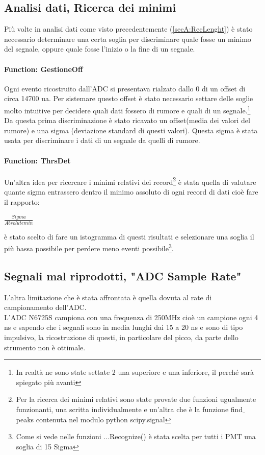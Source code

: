 \documentclass[a4paper]{article}
\begin{document}
\subsection{Analisi dati, Ricerca dei minimi}
\label{secA:Threshold}
Più volte in analisi dati come visto precedentemente (\ref{secA:RecLenght}) è stato necessario determinare una certa soglia per discriminare quale fosse un minimo del segnale, oppure quale fosse l'inizio o la fine di un segnale.
\paragraph{Function: GestioneOff}
Ogni evento ricostruito dall'ADC si presentava rialzato dallo 0 di un offset di circa 14700 ua. Per sistemare questo offset è stato necessario settare delle soglie molto intuitive per decidere quali dati fossero di rumore e quali di un segnale.\footnote{In realtà ne sono state settate 2 una superiore e una inferiore, il perché sarà spiegato più avanti} Da questa prima discriminazione è stato ricavato un offset(media dei valori del rumore) e una sigma (deviazione standard di questi valori). Questa sigma è stata usata per discriminare i dati di un segnale da quelli di rumore.
\paragraph{Function: ThrsDet}
Un'altra idea per ricercare i minimi relativi dei record\footnote{Per la ricerca dei minimi relativi sono state provate due funzioni ugualmente funzionanti, una scritta individualmente e un'altra che è la funzione find$\_$peaks contenuta nel modulo python scipy.signal} è stata quella di valutare quante sigma entrassero dentro il minimo assoluto di ogni record di dati cioè fare il rapporto:

\begin{center}
$\frac{Sigma}{Absolute min}$
\end{center}

è stato scelto di fare un istogramma di questi risultati e selezionare una soglia il più bassa possibile per perdere meno eventi possibile\footnote{Come si vede nelle funzioni ...Recognize() è stata scelta per tutti i PMT una soglia di 15 Sigma}.


\subsection{Segnali mal riprodotti, "ADC Sample Rate"}
\label{sec:Tentativi}
L'altra limitazione che è stata affrontata è quella dovuta al rate di campionamento dell'ADC.\\
L'ADC N6725S campiona con una frequenza di 250MHz cioè un campione ogni 4 ns e sapendo che i segnali sono in media lunghi dai 15 a 20 ns e sono di tipo impulsivo, la ricostruzione di questi, in particolare del picco, da parte dello strumento non è ottimale.
\end{document}
